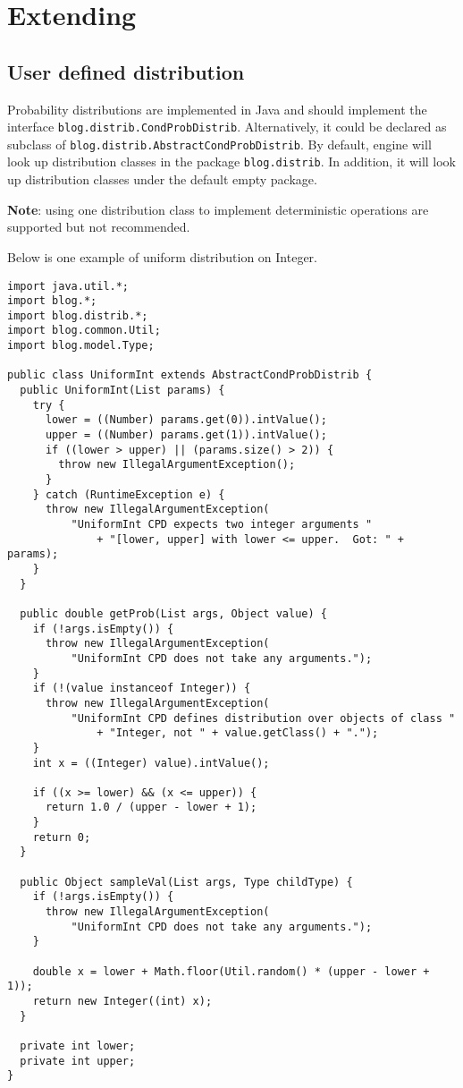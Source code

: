 \documentclass[12pt]{article}
\begin{document}
\section{Extending \bl}
\subsection{User defined distribution}
Probability distributions are implemented in Java and should implement the
 interface \verb|blog.distrib.CondProbDistrib|. Alternatively, it could be declared as subclass of \verb|blog.distrib.AbstractCondProbDistrib|. 
By default, \bl engine will look up distribution classes in the package \verb|blog.distrib|. In addition, it will look up distribution classes under the default empty package. 

{\bf Note}: using one distribution class to implement deterministic operations are supported but not recommended. 

Below is one example of uniform distribution on Integer.

\begin{verbatim}
import java.util.*;
import blog.*;
import blog.distrib.*;
import blog.common.Util;
import blog.model.Type;

public class UniformInt extends AbstractCondProbDistrib {
  public UniformInt(List params) {
    try {
      lower = ((Number) params.get(0)).intValue();
      upper = ((Number) params.get(1)).intValue();
      if ((lower > upper) || (params.size() > 2)) {
        throw new IllegalArgumentException();
      }
    } catch (RuntimeException e) {
      throw new IllegalArgumentException(
          "UniformInt CPD expects two integer arguments "
              + "[lower, upper] with lower <= upper.  Got: " + params);
    }
  }

  public double getProb(List args, Object value) {
    if (!args.isEmpty()) {
      throw new IllegalArgumentException(
          "UniformInt CPD does not take any arguments.");
    }
    if (!(value instanceof Integer)) {
      throw new IllegalArgumentException(
          "UniformInt CPD defines distribution over objects of class "
              + "Integer, not " + value.getClass() + ".");
    }
    int x = ((Integer) value).intValue();

    if ((x >= lower) && (x <= upper)) {
      return 1.0 / (upper - lower + 1);
    }
    return 0;
  }

  public Object sampleVal(List args, Type childType) {
    if (!args.isEmpty()) {
      throw new IllegalArgumentException(
          "UniformInt CPD does not take any arguments.");
    }

    double x = lower + Math.floor(Util.random() * (upper - lower + 1));
    return new Integer((int) x);
  }

  private int lower;
  private int upper;
}
\end{verbatim}
\end{document}
